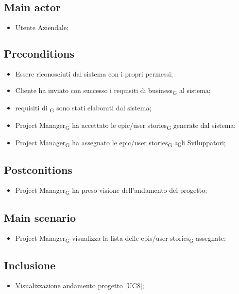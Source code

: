 \documentclass{article}
\begin{document}
    \subsection*{Main actor}
        \begin{itemize}
            \item Utente Aziendale;
        \end{itemize}
        
    \subsection*{Preconditions}
        \begin{itemize}
            \item Essere riconosciuti dal sistema con i propri permessi;
            \item Cliente ha inviato con successo i requisiti di business\textsubscript{G} al sistema;
            \item requisiti di \textsubscript{G} sono stati elaborati dal sistema;
            \item Project Manager\textsubscript{G} ha accettato le epic/user stories\textsubscript{G} generate dal sistema;
            \item Project Manager\textsubscript{G} ha assegnato le epic/user stories\textsubscript{G} agli Sviluppatori;
        \end{itemize}
        
    \subsection*{Postconitions}
    \begin{itemize}
        \item Project Manager\textsubscript{G} ha preso visione dell'andamento del progetto;
    \end{itemize}
    
    \subsection*{Main scenario}
        \begin{itemize}
            \item Project Manager\textsubscript{G} visualizza la lista delle epis/user stories\textsubscript{G} assegnate;
        \end{itemize}
        
    \subsection*{Inclusione}
        \begin{itemize}
            \item Visualizzazione andamento progetto [UC8];
        \end{itemize}
\end{document}
